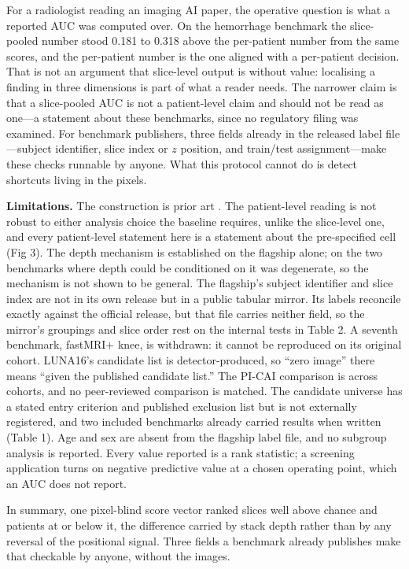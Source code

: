 \documentclass[11pt,letterpaper]{article}
\begin{document}
For a radiologist reading an imaging AI paper, the operative question is what a
reported AUC was computed over. On the hemorrhage benchmark the slice-pooled
number stood 0.181 to 0.318 above the per-patient number from the same scores,
and the per-patient number is the one aligned with a per-patient decision. That
is not an argument that slice-level output is without value: localising a finding
in three dimensions is part of what a reader needs. The narrower claim is that a slice-pooled AUC is not a patient-level
claim and should not be read as one---a statement about these benchmarks, since
no regulatory filing was examined. For benchmark publishers, three fields
already in the released label file---subject identifier, slice index or $z$
position, and train/test assignment---make these checks runnable by anyone. What this protocol cannot do is detect shortcuts living in the pixels.

\textbf{Limitations.} The construction is prior art
\citep{osciiart2020baseline,yan2018deeplesiongraphs}. The patient-level reading
is not robust to either analysis choice the baseline requires, unlike the
slice-level one, and every patient-level statement here is a statement about the
pre-specified cell (Fig 3). The depth mechanism is established on the flagship
alone; on the two benchmarks where depth could be conditioned on it was
degenerate, so the mechanism is not shown to be general. The flagship's subject
identifier and slice index are not in its own release but in a public tabular
mirror. Its labels reconcile exactly against the official release, but that file
carries neither field, so the mirror's groupings and slice order rest on
the internal tests in Table 2. A seventh benchmark, fastMRI+ knee, is withdrawn:
it cannot be reproduced on its original cohort. LUNA16's
candidate list is detector-produced, so ``zero image'' there means ``given the
published candidate list.'' The PI-CAI comparison is across cohorts, and no
peer-reviewed comparison is matched. The candidate universe has a stated entry
criterion and published exclusion list but is not externally registered, and two
included benchmarks already carried results when written (Table 1).
Age and sex are absent from the flagship label file, and no subgroup analysis is
reported. Every value reported is a rank statistic; a screening application turns
on negative predictive value at a chosen operating point, which an AUC does not
report.

In summary, one pixel-blind score vector ranked slices well above chance and
patients at or below it, the difference carried by stack depth rather than by any
reversal of the positional signal. Three fields a benchmark already
publishes make that checkable by anyone, without the images.
\end{document}
